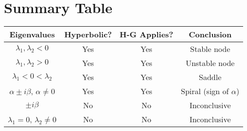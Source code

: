 \documentclass[12pt]{article}
\begin{document}
\section{Summary Table}

\begin{center}
\begin{tabular}{|c|c|c|c|}
\hline
\textbf{Eigenvalues} & \textbf{Hyperbolic?} & \textbf{H-G Applies?} & \textbf{Conclusion} \\
\hline
$\lambda_1, \lambda_2 < 0$ & Yes & Yes & Stable node \\
$\lambda_1, \lambda_2 > 0$ & Yes & Yes & Unstable node \\
$\lambda_1 < 0 < \lambda_2$ & Yes & Yes & Saddle \\
$\alpha \pm i\beta$, $\alpha \neq 0$ & Yes & Yes & Spiral (sign of $\alpha$) \\
$\pm i\beta$ & No & No & Inconclusive \\
$\lambda_1 = 0$, $\lambda_2 \neq 0$ & No & No & Inconclusive \\
\hline
\end{tabular}
\end{center}
\end{document}
